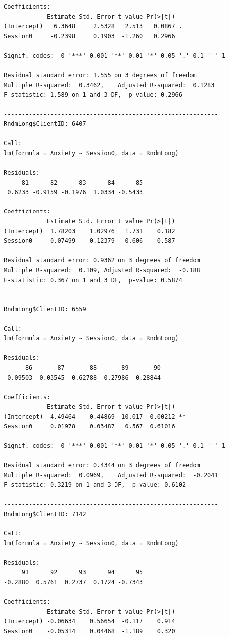 \documentclass[
  english,
]{book}
\begin{document}
\begin{verbatim}
Coefficients:
            Estimate Std. Error t value Pr(>|t|)  
(Intercept)   6.3648     2.5328   2.513   0.0867 .
Session0     -0.2398     0.1903  -1.260   0.2966  
---
Signif. codes:  0 '***' 0.001 '**' 0.01 '*' 0.05 '.' 0.1 ' ' 1

Residual standard error: 1.555 on 3 degrees of freedom
Multiple R-squared:  0.3462,    Adjusted R-squared:  0.1283 
F-statistic: 1.589 on 1 and 3 DF,  p-value: 0.2966

------------------------------------------------------------ 
RndmLong$ClientID: 6407

Call:
lm(formula = Anxiety ~ Session0, data = RndmLong)

Residuals:
     81      82      83      84      85 
 0.6233 -0.9159 -0.1976  1.0334 -0.5433 

Coefficients:
            Estimate Std. Error t value Pr(>|t|)
(Intercept)  1.78203    1.02976   1.731    0.182
Session0    -0.07499    0.12379  -0.606    0.587

Residual standard error: 0.9362 on 3 degrees of freedom
Multiple R-squared:  0.109, Adjusted R-squared:  -0.188 
F-statistic: 0.367 on 1 and 3 DF,  p-value: 0.5874

------------------------------------------------------------ 
RndmLong$ClientID: 6559

Call:
lm(formula = Anxiety ~ Session0, data = RndmLong)

Residuals:
      86       87       88       89       90 
 0.09503 -0.03545 -0.62788  0.27986  0.28844 

Coefficients:
            Estimate Std. Error t value Pr(>|t|)   
(Intercept)  4.49464    0.44869  10.017  0.00212 **
Session0     0.01978    0.03487   0.567  0.61016   
---
Signif. codes:  0 '***' 0.001 '**' 0.01 '*' 0.05 '.' 0.1 ' ' 1

Residual standard error: 0.4344 on 3 degrees of freedom
Multiple R-squared:  0.0969,    Adjusted R-squared:  -0.2041 
F-statistic: 0.3219 on 1 and 3 DF,  p-value: 0.6102

------------------------------------------------------------ 
RndmLong$ClientID: 7142

Call:
lm(formula = Anxiety ~ Session0, data = RndmLong)

Residuals:
     91      92      93      94      95 
-0.2880  0.5761  0.2737  0.1724 -0.7343 

Coefficients:
            Estimate Std. Error t value Pr(>|t|)
(Intercept) -0.06634    0.56654  -0.117    0.914
Session0    -0.05314    0.04468  -1.189    0.320


\end{verbatim}
\end{document}
